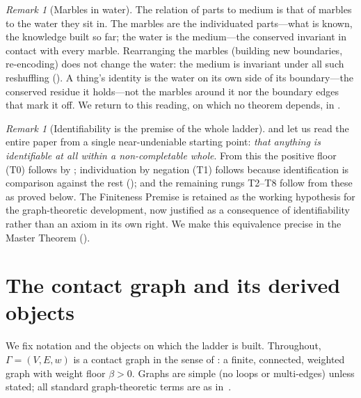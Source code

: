 \documentclass[11pt,a4paper]{article}
\theoremstyle{thmstyle}
\theoremstyle{definition}
\theoremstyle{remark}
\newtheorem{remark}[theorem]{Remark}
\newcommand{\Gph}{\Gamma}                 %
\newcommand{\V}{V}                        %
\newcommand{\E}{E}                        %
\newcommand{\wt}{w}                       %
\newcommand{\floorc}{\beta}               %
\begin{document}
\begin{remark}[Marbles in water]
\label{rem:marbles}
The relation of parts to medium is that of marbles to the water they sit in. The
marbles are the individuated parts---what is known, the knowledge built so far;
the water is the medium---the conserved invariant in contact with every marble.
Rearranging the marbles \textup{(}building new boundaries, re-encoding\textup{)}
does not change the water: the medium is invariant under all such reshuffling
\textup{(}\textup{)}. A thing's identity is the
water on its own side of its boundary---the conserved residue it holds---not the
marbles around it nor the boundary edges that mark it off. We return to this
reading, on which no theorem depends, in .
\end{remark}

\begin{remark}[Identifiability is the premise of the whole ladder]
\label{rem:identifiability}
 and  let us read the entire
paper from a single near-undeniable starting point: \emph{that anything is
identifiable at all within a non-completable whole}. From this the positive floor
\textup{(}T0\textup{)} follows by ; individuation by
negation \textup{(}T1\textup{)} follows because identification is comparison
against the rest \textup{(}\textup{)}; and the remaining
rungs T2--T8 follow from these as proved below. The Finiteness Premise is retained
as the working hypothesis for the graph-theoretic development, now justified as a
consequence of identifiability rather than an axiom in its own right. We make this
equivalence precise in the Master Theorem \textup{(}\textup{)}.
\end{remark}


\section{The contact graph and its derived objects}
\label{sec:setting}

We fix notation and the objects on which the ladder is built. Throughout,
$\Gph=(\V,\E,\wt)$ is a contact graph in the sense of : a finite,
connected, weighted graph with weight floor $\floorc>0$. Graphs are simple
(no loops or multi-edges) unless stated; all standard graph-theoretic terms are
as in~\citet{bondymurty2008,diestel2017}.
\end{document}
